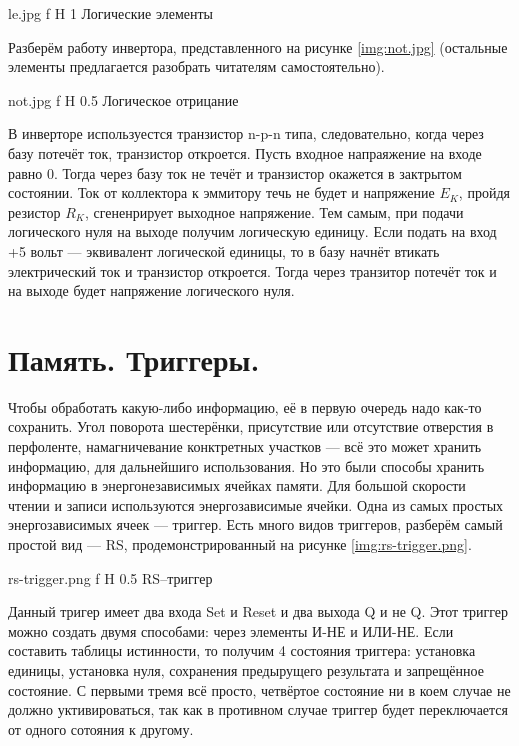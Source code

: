\documentclass{bmstu}
\begin{document}
    {le.jpg}
    {f}
    {H}
    {1\textwidth}
    {Логические элементы}

Разберём работу инвертора, представленного на рисунке \ref{img:not.jpg} (остальные элементы предлагается разобрать читателям самостоятельно). 

    {not.jpg}
    {f}
    {H}
    {0.5\textwidth}
    {Логическое отрицание}

В инверторе используестся транзистор n-p-n типа, следовательно, когда через базу потечёт ток, транзистор откроется.
Пусть входное напраяжение на входе равно 0.
Тогда через базу ток не течёт и транзистор окажется в зактрытом состоянии.
Ток от коллектора к эммитору течь не будет и напряжение $E_K$, пройдя резистор $R_K$, сгененрирует выходное напряжение.
Тем самым, при подачи логического нуля на выходе получим логическую единицу.
Если подать на вход +5 вольт --- эквивалент логической единицы, то в базу начнёт втикать электрический ток и транзистор откроется. 
Тогда через транзитор потечёт ток и на выходе будет напряжение логического нуля.

\section{Память. Триггеры.}

Чтобы обработать какую-либо информацию, её в первую очередь надо как-то сохранить. 
Угол поворота шестерёнки, присутствие или отсутствие отверстия в перфоленте, намагничевание конктретных участков --- всё это может хранить информацию, для дальнейшиго использования.
Но это были способы хранить информацию в энергонезависимых ячейках памяти.
Для большой скорости чтении и записи используются энергозависимые ячейки.
Одна из самых простых энергозависимых ячеек --- триггер. Есть много видов триггеров, разберём самый простой вид --- RS, продемонстрированный на рисунке \ref{img:rs-trigger.png}. 

    {rs-trigger.png}
    {f}
    {H}
    {0.5\textwidth}
    {RS--триггер}

Данный тригер имеет два входа Set и Reset и два выхода Q и не Q. 
Этот триггер можно создать двумя способами: через элементы И-НЕ и ИЛИ-НЕ.
Если составить таблицы истинности, то получим 4 состояния триггера: установка единицы, установка нуля, сохранения предырущего результата и запрещённое состояние. 
С первыми тремя всё просто, четвёртое состояние ни в коем случае не должно уктивироваться, так как в противном случае триггер будет переключается от одного сотояния к другому.
\end{document}
